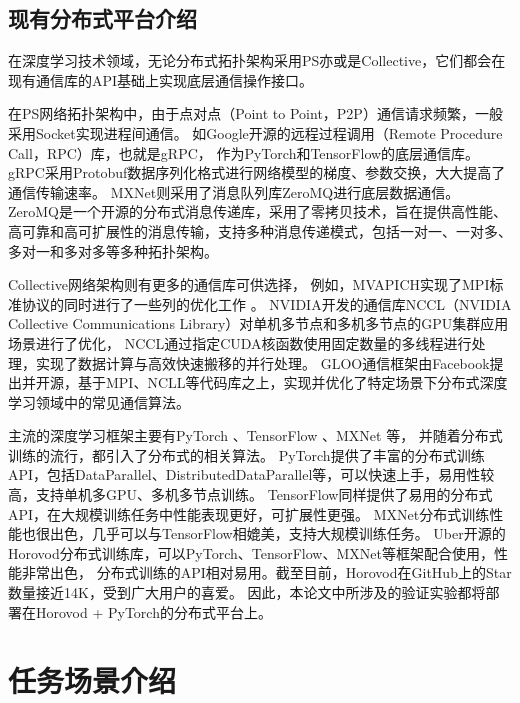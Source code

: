 \documentclass{xdupgthesis}
\begin{document}
\subsection{现有分布式平台介绍}
在深度学习技术领域，无论分布式拓扑架构采用PS亦或是Collective，它们都会在现有通信库的API基础上实现底层通信操作接口。

在PS网络拓扑架构中，由于点对点（Point to Point，P2P）通信请求频繁，一般采用Socket实现进程间通信。
如Google开源的远程过程调用（Remote Procedure Call，RPC）库，也就是gRPC，
作为PyTorch和TensorFlow的底层通信库。gRPC采用Protobuf数据序列化格式进行网络模型的梯度、参数交换，大大提高了通信传输速率。
MXNet则采用了消息队列库ZeroMQ进行底层数据通信。
ZeroMQ是一个开源的分布式消息传递库，采用了零拷贝技术，旨在提供高性能、高可靠和高可扩展性的消息传输，支持多种消息传递模式，包括一对一、一对多、多对一和多对多等多种拓扑架构。

Collective网络架构则有更多的通信库可供选择，
例如，MVAPICH实现了MPI标准协议的同时进行了一些列的优化工作 \cite{anthony2020efficient} \cite{jain2019scaling} \cite{awan2019optimized} \cite{awan2019scalable}。
NVIDIA开发的通信库NCCL（NVIDIA Collective Communications Library）对单机多节点和多机多节点的GPU集群应用场景进行了优化，
NCCL通过指定CUDA核函数使用固定数量的多线程进行处理，实现了数据计算与高效快速搬移的并行处理。
GLOO通信框架由Facebook提出并开源，基于MPI、NCLL等代码库之上，实现并优化了特定场景下分布式深度学习领域中的常见通信算法。

主流的深度学习框架主要有PyTorch \cite{paszke2019pytorch}、TensorFlow \cite{abadi2016tensorflow}、MXNet \cite{chen2015mxnet}等，
并随着分布式训练的流行，都引入了分布式的相关算法。
PyTorch提供了丰富的分布式训练API，包括DataParallel、DistributedDataParallel等，可以快速上手，易用性较高，支持单机多GPU、多机多节点训练。
TensorFlow同样提供了易用的分布式API，在大规模训练任务中性能表现更好，可扩展性更强。
MXNet分布式训练性能也很出色，几乎可以与TensorFlow相媲美，支持大规模训练任务。
Uber开源的Horovod分布式训练库，可以PyTorch、TensorFlow、MXNet等框架配合使用，性能非常出色，
分布式训练的API相对易用。截至目前，Horovod在GitHub上的Star数量接近14K，受到广大用户的喜爱。
因此，本论文中所涉及的验证实验都将部署在Horovod + PyTorch的分布式平台上。


\section{任务场景介绍}
\end{document}
